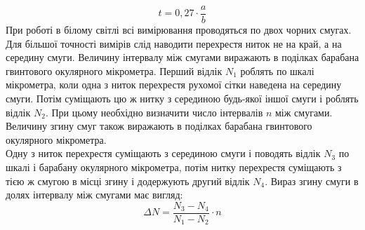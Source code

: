 $$t = 0,27 \cdot \frac{a}{b}$$
При роботі в білому світлі всі вимірювання проводяться по двох чорних смугах. Для
більшої точності вимірів слід наводити перехрестя ниток не на край, а на середину смуги.
Величину інтервалу між смугами виражають в поділках барабана гвинтового окулярного
мікрометра. Перший відлік $N_1$ роблять по шкалі мікрометра, коли одна з ниток перехрестя
рухомої сітки наведена на середину смуги. Потім суміщають цю ж нитку з серединою будь-якої
іншої смуги і роблять відлік $N_2$. При цьому необхідно визначити число інтервалів $n$ між смугами.
Величину згину смуг також виражають в поділках барабана гвинтового окулярного мікрометра. \\
Одну з ниток перехрестя суміщають з серединою смуги і поводять відлік $N_3$ по шкалі і
барабану окулярного мікрометра, потім нитку перехрестя суміщають з тією ж смугою в місці
згину і додержують другий відлік $N_4$. Вираз згину смуги в долях інтервалу між смугами має
вигляд:
$$\Delta N = \frac{N_3 - N_4}{N_1-N_2} \cdot n$$
